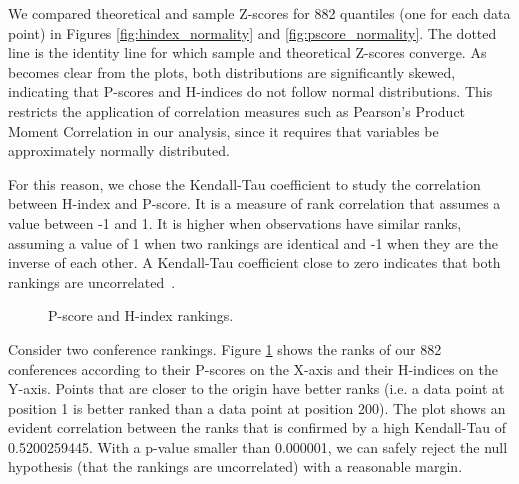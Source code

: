 \documentclass[notitlepage]{svjour3}
\begin{document}
We compared theoretical and sample Z-scores for 882 quantiles (one for each data point) in Figures
\ref{fig:hindex_normality} and \ref{fig:pscore_normality}. The dotted line is the identity line for
which sample and theoretical Z-scores converge. As becomes clear from the plots, both distributions
are significantly skewed, indicating that P-scores and H-indices do not follow normal
distributions. This restricts the application of correlation measures such as Pearson's Product 
Moment Correlation in our analysis, since it requires that variables be approximately normally 
distributed. 

For this reason, we chose the Kendall-Tau coefficient to
study the correlation 
between H-index and P-score. It is a measure of rank
correlation that assumes a value between
-1 and 1. It is higher when observations have similar
ranks, assuming a value of 1
when two rankings are identical and -1 when they are the inverse of each other. 
A Kendall-Tau coefficient close to zero indicates
that both rankings are uncorrelated~\cite{Kendall1955,Baeza-Yates2011}.

\begin{figure}[h!]
  \begin{center}
    \caption{P-score and H-index rankings.}
    \label{fig:pscore_hindex_ranks}
  \end{center}
\end{figure}

Consider two conference rankings. Figure \ref{fig:pscore_hindex_ranks} shows the ranks of our 882 conferences according to
their P-scores
on the X-axis and their H-indices on the Y-axis. Points that are closer to the origin have better ranks (i.e. a data point at position 1 is better ranked than a data point at position 200).
The plot shows an evident correlation between the ranks that is confirmed
by a high Kendall-Tau of 0.5200259445. With a p-value smaller than 0.000001, we can safely reject the null 
hypothesis (that the rankings are uncorrelated) with a reasonable margin.
\end{document}

